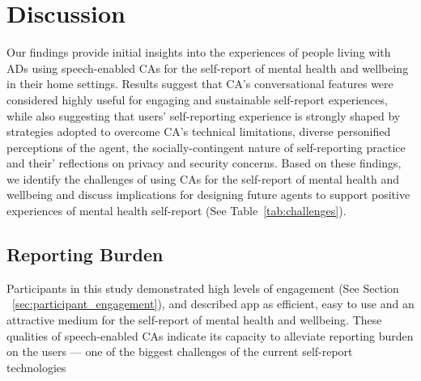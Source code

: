 

\section{Discussion}

    Our findings provide initial insights into the experiences of people living with \ac{AD}s using speech-enabled \ac{CA}s for the self-report of mental health and wellbeing in their home settings. Results suggest that \ac{CA}'s conversational features were considered highly useful for engaging and sustainable self-report experiences, while also suggesting that users' self-reporting experience is strongly shaped by strategies adopted to overcome \ac{CA}'s technical limitations, diverse personified perceptions of the agent, the socially-contingent nature of self-reporting practice and their' reflections on privacy and security concerns.
    Based on these findings, we identify the challenges of using \ac{CA}s for the self-report of mental health and wellbeing and discuss implications for designing future agents to support positive experiences of mental health self-report (See Table~\ref{tab:challenges}).

    
    
    
    \subsection{Reporting Burden}
        
        Participants in this study demonstrated high levels of engagement (See Section ~\ref{sec:participant_engagement}), and described \acl{app} as efficient, easy to use and an attractive medium for the self-report of mental health and wellbeing. These qualities of speech-enabled \ac{CA}s indicate its capacity to alleviate reporting burden on the users --- one of the biggest challenges of the current self-report technologies~\cite{harari2016using, van2017experience, doherty2020design}
        
